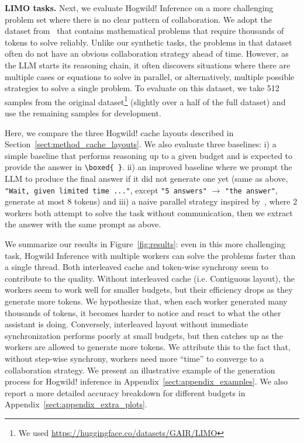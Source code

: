\textbf{LIMO tasks.} Next, we evaluate Hogwild! Inference on a more challenging problem set where there is no clear pattern of collaboration. We adopt the dataset from~\cite{ye2025limoreasoning} that contains mathematical problems that require thousands of tokens to solve reliably. Unlike our synthetic tasks, the problems in that dataset often do not have an obvious collaboration strategy ahead of time. However, as the LLM starts its reasoning chain, it often discovers situations where there are multiple cases or equations to solve in parallel, or alternatively, multiple possible strategies to solve a single problem. To evaluate on this dataset, we take 512 samples from the original dataset\footnote[11]{We used \url{https://huggingface.co/datasets/GAIR/LIMO}} (slightly over a half of the full dataset) and use the remaining samples for development.

Here, we compare the three Hogwild! cache layouts described in Section~\ref{sect:method_cache_layouts}. We also evaluate three baselines: i) a simple baseline that performs reasoning up to a given budget and is expected to provide the answer in \texttt{\textbackslash boxed\{ \}}. ii) an improved baseline where we prompt the LLM to produce the final answer if it did not generate one yet (same as above, \texttt{"Wait, given limited time ..."}, except \texttt{"5 answers"} $\longrightarrow$ \texttt{"the answer"}, generate at most 8 tokens) and iii) a naive parallel strategy inspired by~\cite{Wang2022SelfConsistencyIC}, where 2 workers both attempt to solve the task without communication, then we extract the answer with the same prompt as above.


We summarize our results in Figure~\ref{fig:results}: even in this more challenging task, Hogwild\! Inference with multiple workers can solve the problems faster than a single thread. Both interleaved cache and token-wise synchrony seem to contribute to the quality. Without interleaved cache (i.e. Contiguous layout), the workers seem to work well for smaller budgets, but their efficiency drops as they generate more tokens. We hypothesize that, when each worker generated many thousands of tokens, it becomes harder to notice and react to what the other assistant is doing. Conversely, interleaved layout without immediate synchronization performs poorly at small budgets, but then catches up as the workers are allowed to generate more tokens. We attribute this to the fact that, without step-wise synchrony, workers need more ``time'' to converge to a collaboration strategy. We present an illustrative example of the generation process for Hogwild! inference in Appendix~\ref{sect:appendix_examples}. We also report a more detailed accuracy breakdown for different budgets in Appendix~\ref{sect:appendix_extra_plots}.

